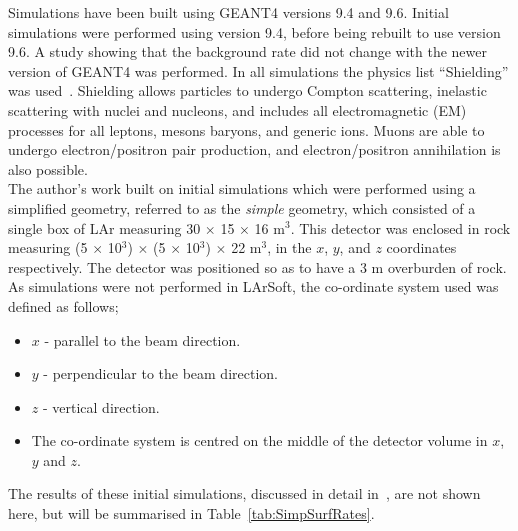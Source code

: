 Simulations have been built using GEANT4 versions 9.4 and 9.6. Initial simulations were performed using version 9.4, before being rebuilt to use version 9.6. A study showing that the background rate did not change with the newer version of GEANT4 was performed. In all simulations the physics list ``Shielding'' was used~\citep{Shielding}. Shielding allows particles to undergo Compton scattering, inelastic scattering with nuclei and nucleons, and includes all electromagnetic (EM) processes for all leptons, mesons baryons, and generic ions. Muons are able to undergo electron/positron pair production, and electron/positron annihilation is also possible. \\

The author's work built on initial simulations which were performed using a simplified geometry, referred to as the \emph{simple} geometry, which consisted of a single box of LAr measuring 30 $\times$ 15 $\times$ 16 m$^3$. This detector was enclosed in rock measuring (5 $\times$ 10$^3$) $\times$ (5 $\times$ 10$^3$) $\times$ 22 m$^{3}$, in the $x$, $y$, and $z$ coordinates respectively. The detector was positioned so as to have a 3 m overburden of rock. As simulations were not performed in LArSoft, the co-ordinate system used was defined as follows;
\begin{itemize}
\item $x$ - parallel to the beam direction.
\item $y$ - perpendicular to the beam direction.
\item $z$ - vertical direction.
\item The co-ordinate system is centred on the middle of the detector volume in $x$, $y$ and $z$.
\end{itemize}
The results of these initial simulations, discussed in detail in~\citep{MartinsThesis}, are not shown here, but will be summarised in Table~\ref{tab:SimpSurfRates}. \\

